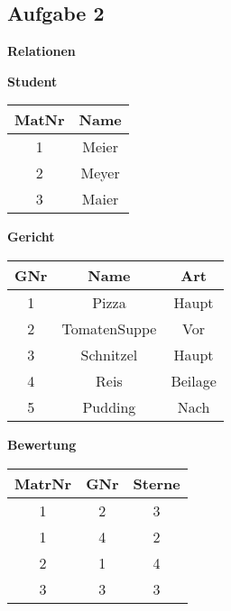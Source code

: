 \subsection{Aufgabe 2}
\begin{table}[H]
    \scriptsize
    \centering
    \textbf{Relationen} \\ [10pt]
    \begin{minipage}[t]{0.2\textwidth}
        \centering
        \textbf{Student} \\[3pt]
        \begin{tabular}{|c|c|}
            \hline
            \textbf{MatNr} & \textbf{Name} \\
            \hline
            1 & Meier \\
            2 & Meyer \\
            3 & Maier \\
            \hline
        \end{tabular}
    \end{minipage}
    \hspace{0.2cm}
    \begin{minipage}[t]{0.3\textwidth}
        \centering
        \textbf{Gericht} \\ [3pt]
        \begin{tabular}{|c|c|c|}
            \hline
            \textbf{GNr} & \textbf{Name} & \textbf{Art} \\
            \hline
            1 & Pizza            & Haupt \\
            2 & TomatenSuppe     & Vor \\
            3 & Schnitzel        & Haupt \\
            4 & Reis             & Beilage \\
            5 & Pudding          & Nach \\
            \hline
        \end{tabular}
    \end{minipage}
    \hspace{0.2cm}
    \begin{minipage}[t]{0.3\textwidth}
        \centering
        \textbf{Bewertung} \\ [3pt]
        \begin{tabular}{|c|c|c|}
            \hline
            \textbf{MatrNr} & \textbf{GNr} & \textbf{Sterne} \\
            \hline
            1 & 2    & 3 \\
            1 & 4    & 2 \\
            2 & 1    & 4\\
            3 & 3    & 3 \\
            \hline
        \end{tabular}
    \end{minipage}
\end{table}

